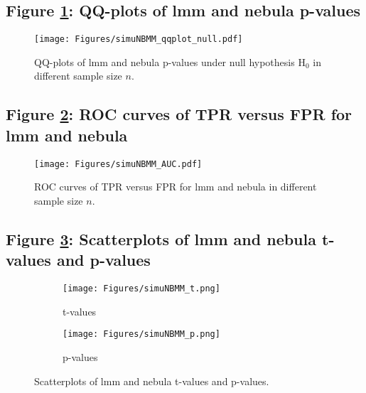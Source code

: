 \documentclass[
]{article}
\begin{document}
\hypertarget{figure-qq-plots-of-lmm-and-nebula-p-values}{%
\subsection{\texorpdfstring{Figure \ref{fig:nbinom_QQ}: QQ-plots of lmm
and nebula
p-values}{Figure : QQ-plots of lmm and nebula p-values}}\label{figure-qq-plots-of-lmm-and-nebula-p-values}}

\begin{figure}
\centering
\texttt{[image: Figures/simuNBMM\_qqplot\_null.pdf]}
\caption{QQ-plots of lmm and nebula p-values under null hypothesis
H\(_0\) in different sample size \(n\). \label{fig:nbinom_QQ}}
\end{figure}

\hypertarget{figure-roc-curves-of-tpr-versus-fpr-for-lmm-and-nebula}{%
\subsection{\texorpdfstring{Figure \ref{fig:nbinom_ROC}: ROC curves of
TPR versus FPR for lmm and
nebula}{Figure : ROC curves of TPR versus FPR for lmm and nebula}}\label{figure-roc-curves-of-tpr-versus-fpr-for-lmm-and-nebula}}

\begin{figure}
\centering
\texttt{[image: Figures/simuNBMM\_AUC.pdf]}
\caption{ROC curves of TPR versus FPR for lmm and nebula in different
sample size \(n\). \label{fig:nbinom_ROC}}
\end{figure}

\hypertarget{figure-scatterplots-of-lmm-and-nebula-t-values-and-p-values}{%
\subsection{\texorpdfstring{Figure \ref{fig:nbinomperform}: Scatterplots
of lmm and nebula t-values and
p-values}{Figure : Scatterplots of lmm and nebula t-values and p-values}}\label{figure-scatterplots-of-lmm-and-nebula-t-values-and-p-values}}

\begin{figure}[htb]
     \centering
     \begin{subfigure}[b]{0.45\textwidth}
         \centering
         \texttt{[image: Figures/simuNBMM\_t.png]}
         \caption{t-values}
     \end{subfigure}
     \begin{subfigure}[b]{0.45\textwidth}
         \centering
         \texttt{[image: Figures/simuNBMM\_p.png]}
         \caption{p-values}
     \end{subfigure}    
     \centering
     \caption{Scatterplots of lmm and nebula t-values and p-values.}
     \label{fig:nbinomperform}
\end{figure}
\end{document}
